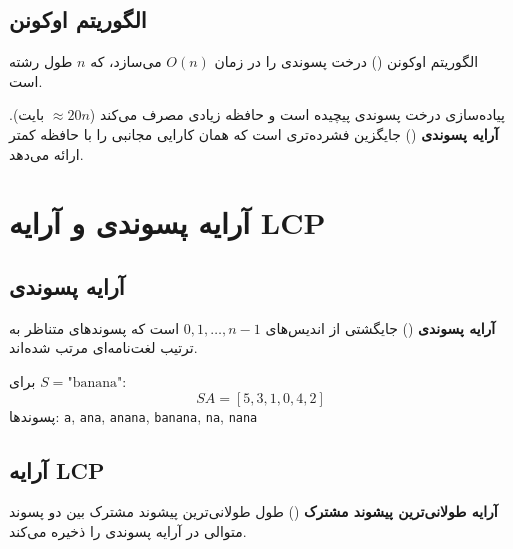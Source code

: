 \documentclass{matinbook}
\begin{document}
    \subsection{الگوریتم اوکونن}
    
    الگوریتم اوکونن
    () درخت پسوندی
    را در زمان $O(n)$ می‌سازد،
    که $n$ طول رشته است.
    
    \begin{remark}
        پیاده‌سازی درخت پسوندی پیچیده است
        و حافظه زیادی مصرف می‌کند
        ($\approx 20n$ بایت).
        \textbf{آرایه پسوندی}
        () جایگزین
        فشرده‌تری است که همان کارایی
        مجانبی را با حافظه کمتر ارائه می‌دهد.
        \label{rem:suffix-tree-memory}
    \end{remark}
    
    \section{آرایه پسوندی و آرایه LCP}
    
    \subsection{آرایه پسوندی}
    
    \begin{definition}
        \textbf{آرایه پسوندی}
        () جایگشتی از
        اندیس‌های $0, 1, \ldots, n-1$ است
        که پسوندهای متناظر به ترتیب
        لغت‌نامه‌ای مرتب شده‌اند.
        \label{def:suffix-array}
    \end{definition}
    
    برای $S = \text{"banana"}$:
    \[
    SA = [5, 3, 1, 0, 4, 2]
    \]
    پسوندها: \texttt{a}, \texttt{ana}, \texttt{anana},
    \texttt{banana}, \texttt{na}, \texttt{nana}
    
    \subsection{آرایه LCP}
    
    \begin{definition}
        \textbf{آرایه طولانی‌ترین پیشوند مشترک}
        () طول طولانی‌ترین
        پیشوند مشترک بین دو پسوند متوالی
        در آرایه پسوندی را ذخیره می‌کند.
        \label{def:lcp-array}
    \end{definition}
    
\end{document}
